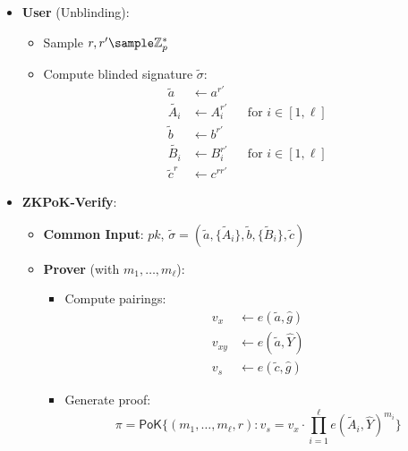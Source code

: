 \begin{itemize}
\begin{itemize}
        \item \textbf{User} (Unblinding):
            \begin{itemize}
                \item Sample $r, r' \sample \Z_p^*$
                \item Compute blinded signature $\tilde{\sigma}$:
                    \begin{align*}
                        \tilde{a} &\gets a^{r'} \\
                        \tilde{A_i} &\gets A_i^{r'} && \text{for } i \in [1,\ell] \\
                        \tilde{b} &\gets b^{r'} \\
                        \tilde{B_i} &\gets B_i^{r'} && \text{for } i \in [1,\ell] \\
                        \tilde{c}^r &\gets c^{r r'}
                    \end{align*}
            \end{itemize}

    \item \textbf{ZKPoK-Verify}:
    \begin{itemize}
        \item \textbf{Common Input}: $pk$, $\tilde{\sigma} = (\tilde{a}, \{\tilde{A}_i\}, \tilde{b}, \{\tilde{B}_i\}, \tilde{c})$
        
        \item \textbf{Prover} (with $m_1, \ldots, m_\ell$):
            \begin{itemize}
                \item Compute pairings:
                    \begin{align*}
                        v_x &\gets e(\tilde{a}, \hat{g}) \\
                        v_{xy} &\gets e(\tilde{a}, \widehat{Y}) \\
                        v_s &\gets e(\tilde{c}, \hat{g})
                    \end{align*}
                \item Generate proof:
                    \[
                    \pi = \mathsf{PoK}\{(m_1, \ldots, m_\ell, r): v_s = v_x \cdot \prod_{i=1}^\ell e(\tilde{A}_i, \widehat{Y})^{m_i}\}
                    \]
            \end{itemize}
        

\end{itemize}
\end{itemize}
\end{itemize}
